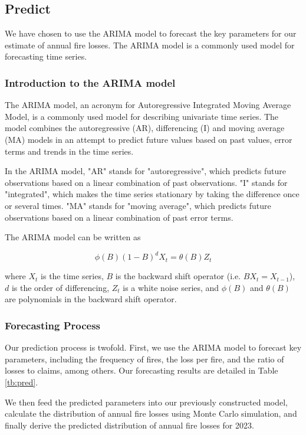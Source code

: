 \documentclass[12pt]{article}  %
\begin{document}
\subsection{Predict}
We have chosen to use the ARIMA model to forecast the key parameters for our estimate of annual fire losses. The ARIMA model is a commonly used model for forecasting time series.\textsuperscript{\cite{arima4, arima, arima2, arima3}}

\subsubsection{Introduction to the ARIMA model}

The ARIMA model, an acronym for Autoregressive Integrated Moving Average Model, is a commonly used model for describing univariate time series. The model combines the autoregressive (AR), differencing (I) and moving average (MA) models in an attempt to predict future values based on past values, error terms and trends in the time series.

In the ARIMA model, "AR" stands for "autoregressive", which predicts future observations based on a linear combination of past observations. "I" stands for "integrated", which makes the time series stationary by taking the difference once or several times. "MA" stands for "moving average", which predicts future observations based on a linear combination of past error terms.

The ARIMA model can be written as

\begin{equation}
\phi(B) (1-B)^d X_t = \theta(B) Z_t
\end{equation}

where $X_t$ is the time series, $B$ is the backward shift operator (i.e. $BX_t = X_{t-1}$), $d$ is the order of differencing, $Z_t$ is a white noise series, and $\phi(B)$ and $\theta(B)$ are polynomials in the backward shift operator.

\subsubsection{Forecasting Process}

Our prediction process is twofold. First, we use the ARIMA model to forecast key parameters, including the frequency of fires, the loss per fire, and the ratio of losses to claims, among others. Our forecasting results are detailed in Table \ref{tb:pred}.

We then feed the predicted parameters into our previously constructed model, calculate the distribution of annual fire losses using Monte Carlo simulation, and finally derive the predicted distribution of annual fire losses for 2023.
\end{document}
